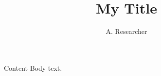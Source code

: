 \documentclass{beamer}
\title{My Title}
\author{A. Researcher}
\begin{document}
{
\begin{frame}[plain]\titlepage\end{frame}
}
\begin{frame}{Content}
Body text.
\end{frame}
\end{document}
